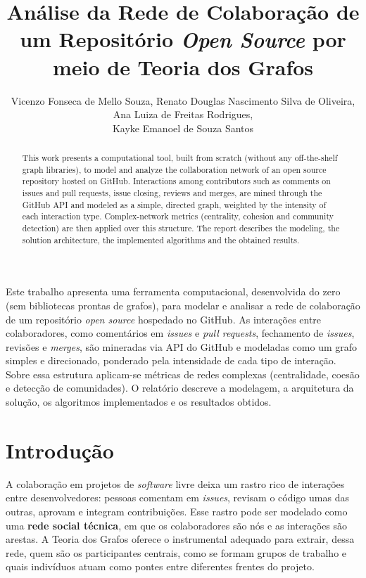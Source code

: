 \documentclass[12pt]{article}
\title{Análise da Rede de Colaboração de um Repositório \emph{Open Source}
       por meio de Teoria dos Grafos}
\author{
  Vicenzo Fonseca de Mello Souza\inst{1},
  Renato Douglas Nascimento Silva de Oliveira\inst{1},\\
  Ana Luiza de Freitas Rodrigues\inst{1},\\
  Kayke Emanoel de Souza Santos\inst{1}
}
\begin{document}
\maketitle

\begin{resumo}
Este trabalho apresenta uma ferramenta computacional, desenvolvida do zero (sem
bibliotecas prontas de grafos), para modelar e analisar a rede de colaboração de
um repositório \emph{open source} hospedado no GitHub. As interações entre
colaboradores, como comentários em \emph{issues} e \emph{pull requests},
fechamento de \emph{issues}, revisões e \emph{merges}, são mineradas via API
do GitHub e modeladas como um grafo simples e direcionado, ponderado pela
intensidade de cada tipo de interação. Sobre essa estrutura aplicam-se métricas
de redes complexas (centralidade, coesão e detecção de comunidades). O relatório
descreve a modelagem, a arquitetura da solução, os algoritmos implementados e os
resultados obtidos.
\end{resumo}

\begin{abstract}
This work presents a computational tool, built from scratch (without any
off-the-shelf graph libraries), to model and analyze the collaboration network
of an open source repository hosted on GitHub. Interactions among contributors
such as comments on issues and pull requests, issue closing, reviews and merges,
are mined through the GitHub API and modeled as a simple, directed graph,
weighted by the intensity of each interaction type. Complex-network metrics
(centrality, cohesion and community detection) are then applied over this
structure. The report describes the modeling, the solution architecture, the
implemented algorithms and the obtained results.
\end{abstract}

\section{Introdução}

A colaboração em projetos de \emph{software} livre deixa um rastro rico de
interações entre desenvolvedores: pessoas comentam em \emph{issues}, revisam o
código umas das outras, aprovam e integram contribuições. Esse rastro pode ser
modelado como uma \textbf{rede social técnica}, em que os colaboradores são nós e
as interações são arestas. A Teoria dos Grafos oferece o instrumental adequado
para extrair, dessa rede, quem são os participantes centrais, como se formam
grupos de trabalho e quais indivíduos atuam como pontes entre diferentes frentes
do projeto.
\end{document}
